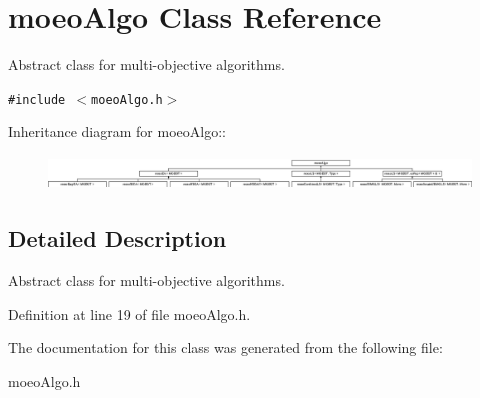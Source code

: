\section{moeo\-Algo Class Reference}
\label{classmoeoAlgo}
Abstract class for multi-objective algorithms.  


{\tt \#include $<$moeo\-Algo.h$>$}

Inheritance diagram for moeo\-Algo::\begin{figure}[H]
\begin{center}
\leavevmode
\includegraphics[height=0.909091cm]{classmoeoAlgo}
\end{center}
\end{figure}


\subsection{Detailed Description}
Abstract class for multi-objective algorithms. 



Definition at line 19 of file moeo\-Algo.h.

The documentation for this class was generated from the following file:\begin{CompactItemize}
\item 
moeo\-Algo.h\end{CompactItemize}
